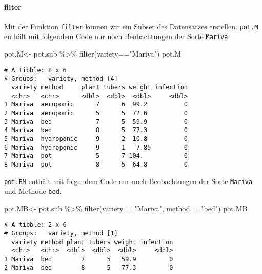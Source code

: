 \documentclass[
  letterpaper,
  DIV=11,
  numbers=noendperiod]{scrartcl}
\let\oldparagraph\paragraph
\renewcommand{\paragraph}[1]{\oldparagraph{#1}\mbox{}}
\newenvironment{Shaded}{\begin{snugshade}}{\end{snugshade}}
\newcommand{\FunctionTok}[1]{\textcolor[rgb]{0.28,0.35,0.67}{#1}}
\newcommand{\NormalTok}[1]{\textcolor[rgb]{0.00,0.23,0.31}{#1}}
\newcommand{\OtherTok}[1]{\textcolor[rgb]{0.00,0.23,0.31}{#1}}
\newcommand{\SpecialCharTok}[1]{\textcolor[rgb]{0.37,0.37,0.37}{#1}}
\newcommand{\StringTok}[1]{\textcolor[rgb]{0.13,0.47,0.30}{#1}}
\begin{document}
\hypertarget{filter}{%
\paragraph{filter}\label{filter}}

Mit der Funktion \texttt{filter} können wir ein Subset des Datensatzes
erstellen. \texttt{pot.M} enthält mit folgendem Code nur noch
Beobachtungen der Sorte \texttt{Mariva}.

\begin{Shaded}
\begin{Highlighting}[]
\NormalTok{pot.M}\OtherTok{\textless{}{-}}\NormalTok{ pot.sub }\SpecialCharTok{\%\textgreater{}\%} \FunctionTok{filter}\NormalTok{(variety}\SpecialCharTok{==}\StringTok{"Mariva"}\NormalTok{)}
\NormalTok{pot.M}
\end{Highlighting}
\end{Shaded}

\begin{verbatim}
# A tibble: 8 x 6
# Groups:   variety, method [4]
  variety method     plant tubers weight infection
  <chr>   <chr>      <dbl>  <dbl>  <dbl>     <dbl>
1 Mariva  aeroponic      7      6  99.2          0
2 Mariva  aeroponic      5      5  72.6          0
3 Mariva  bed            7      5  59.9          0
4 Mariva  bed            8      5  77.3          0
5 Mariva  hydroponic     9      2  10.8          0
6 Mariva  hydroponic     9      1   7.85         0
7 Mariva  pot            5      7 104.           0
8 Mariva  pot            8      5  64.8          0
\end{verbatim}

\texttt{pot.BM} enthält mit folgendem Code nur noch Beobachtungen der
Sorte \texttt{Mariva} und Methode \texttt{bed}.

\begin{Shaded}
\begin{Highlighting}[]
\NormalTok{pot.MB}\OtherTok{\textless{}{-}}\NormalTok{ pot.sub }\SpecialCharTok{\%\textgreater{}\%} \FunctionTok{filter}\NormalTok{(variety}\SpecialCharTok{==}\StringTok{"Mariva"}\NormalTok{, method}\SpecialCharTok{==}\StringTok{"bed"}\NormalTok{)}
\NormalTok{pot.MB  }
\end{Highlighting}
\end{Shaded}

\begin{verbatim}
# A tibble: 2 x 6
# Groups:   variety, method [1]
  variety method plant tubers weight infection
  <chr>   <chr>  <dbl>  <dbl>  <dbl>     <dbl>
1 Mariva  bed        7      5   59.9         0
2 Mariva  bed        8      5   77.3         0
\end{verbatim}
\end{document}
